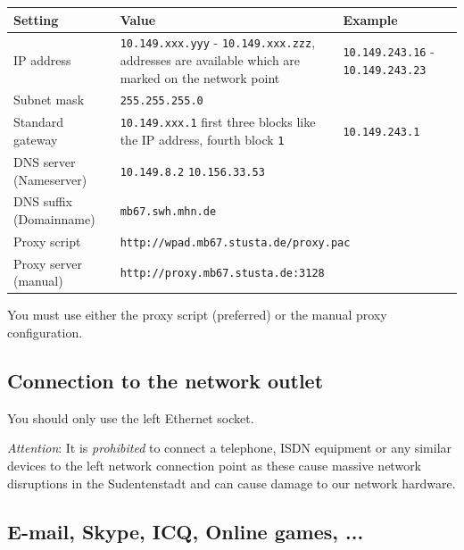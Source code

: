 \documentclass[a4paper,12pt]{scrartcl}
\begin{document}
\begin{center}
  \begin{tabularx}{\linewidth}{|lXp{.2\linewidth}|}
    \hline
    Setting & Value & Example \\
    \hline \hline
    IP address & \nolinkurl{10.149.xxx.yyy} - \nolinkurl{10.149.xxx.zzz}, \newline 8 addresses are available which are marked on the network point & \nolinkurl{10.149.243.16} - \nolinkurl{10.149.243.23} \\
    \hline
    Subnet mask & \nolinkurl{255.255.255.0} & \\
    \hline
    Standard gateway & \nolinkurl{10.149.xxx.1} \newline first three blocks like the IP address, fourth block \nolinkurl{1} & \nolinkurl{10.149.243.1} \\
    \hline
		  DNS server (Nameserver) & \nolinkurl{10.149.8.2} \newline \nolinkurl{10.156.33.53} & \\
    \hline
    DNS suffix (Domainname) & \nolinkurl{mb67.swh.mhn.de} & \\
    \hline
    Proxy script & \multicolumn{2}{l|}{\nolinkurl{http://wpad.mb67.stusta.de/proxy.pac}} \\
    \hline
    Proxy server (manual) & \multicolumn{2}{l|}{\nolinkurl{http://proxy.mb67.stusta.de:3128}} \\
    \hline
  \end{tabularx}
\end{center}

You must use either the proxy script (preferred) or the manual proxy configuration.

\subsection*{Connection to the network outlet}

You should only use the left Ethernet socket.

\emph{Attention}: It is \emph{prohibited} to connect a telephone, ISDN equipment or any similar devices to the left network connection point as these cause massive network disruptions in the Sudentenstadt and can cause damage to our network hardware.

\subsection*{E-mail, Skype, ICQ, Online games, ...}
\end{document}
